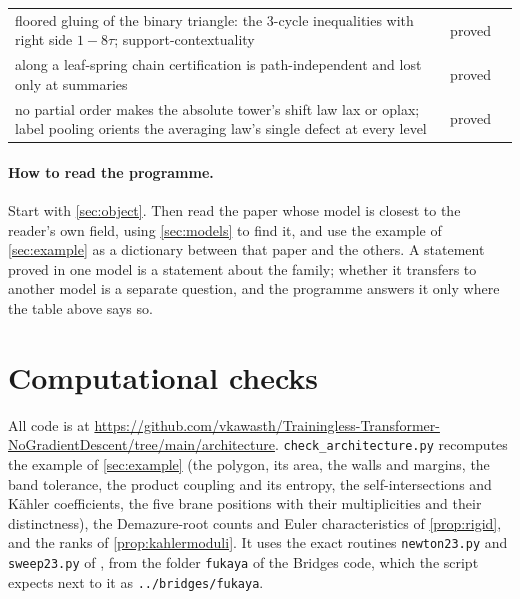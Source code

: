 \documentclass[11pt]{article}
\theoremstyle{definition}
\theoremstyle{remark}
\begin{document}
\begin{center}
\begin{tabular}{p{7.2cm}p{2.2cm}p{5.4cm}}
floored gluing of the binary triangle: the 3-cycle inequalities with right side $1-8\tau$; support-contextuality & proved & \cite[Thm.~4.8]{Conditionals}\\
along a leaf-spring chain certification is path-independent and lost only at summaries & proved & \cite[Thm.~10.26]{Tower}\\
no partial order makes the absolute tower's shift law lax or oplax; label pooling orients the averaging law's single defect at every level & proved & \cite[Thm.~13.15, Thm.~13.16, Prop.~13.17]{Tower}\\
\bottomrule
\end{tabular}
\end{center}

\paragraph{How to read the programme.} Start with \cref{sec:object}. Then read the paper whose model is closest to the reader's own
field, using \cref{sec:models} to find it, and use the example of \cref{sec:example} as a dictionary between that paper and the others. A
statement proved in one model is a statement about the family; whether it transfers to another model is a separate question, and the
programme answers it only where the table above says so.

\section{Computational checks}\label{sec:code}

All code is at \url{https://github.com/vkawasth/Trainingless-Transformer-NoGradientDescent/tree/main/architecture}. \texttt{check\_architecture.py} recomputes the example of \cref{sec:example} (the polygon, its area, the walls and margins, the band
tolerance, the product coupling and its entropy, the self-intersections and Kähler coefficients, the five brane positions with their
multiplicities and their distinctness), the Demazure-root counts and Euler characteristics of \cref{prop:rigid}, and the ranks of
\cref{prop:kahlermoduli}. It uses the exact routines \texttt{newton23.py} and \texttt{sweep23.py} of \cite[\S8]{Bridges}, from the folder \texttt{fukaya} of the
Bridges code, which the script expects next to it as \texttt{../bridges/fukaya}.
\end{document}
